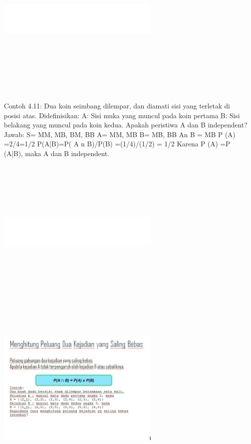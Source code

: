 \documentclass[11pt,fleqn]{book} %
\begin{document}
{\includegraphics[width = 8cm, height= 8cm]{Pictures/muammar3.jpg}




Contoh 4.11:
Dua koin seimbang dilempar, dan diamati sisi yang terletak di posisi atas.
Didefinisikan: A: Sisi muka yang muncul pada koin pertama
B: Sisi belakang yang muncul pada koin kedua.
Apakah peristiwa A dan B independent?
Jawab:
S= {MM, MB, BM, BB}
A= {MM, MB}
B= {MB, BB}
An B = {MB}
P (A) =2/4=1/2
P(A|B)=P( A n B)/P(B) =(1/4)/(1/2) = 1/2
Karena P (A) =P (A|B), maka A dan B independent.
\includegraphics[width = 8cm, height= 8cm]{Pictures/muammar3.jpg}

\includegraphics[width = 8cm, height= 8cm]{Pictures/muammar5.jpg}


}
\end{document}
